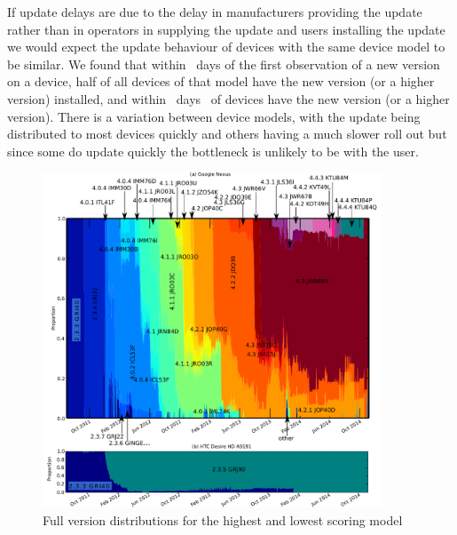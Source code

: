If update delays are due to the delay in manufacturers providing the update rather than in operators in supplying the update and users installing the update we would expect the update behaviour of devices with the same device model to be similar.
We found that within \daModelHalfDeployment\ days of the first observation of a new version on a device, half of all devices of that model have the new version (or a higher version) installed, and within \daModelFullDeployment\ days \daFullDeployedAt\ of devices have the new version (or a higher version).
There is a variation between device models, with the update being distributed to most devices quickly and others having a much slower roll out but since some do update quickly the bottleneck is unlikely to be with the user.

\begin{figure}
 \centering
 \includegraphics[width=0.9\textwidth]{figures/full_version_comp.pdf}
 \caption{Full version distributions for the highest and lowest scoring model}
 \label{fig:full_version_comp}
\end{figure}

